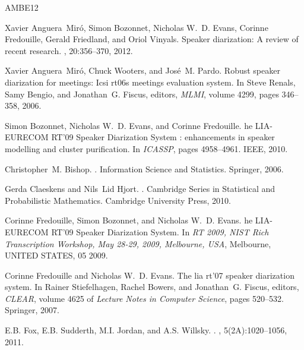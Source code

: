 \begin{thebibliography}{AMBE{\etalchar{+}}12}

Xavier Anguera~Miró, Simon Bozonnet, Nicholas W.~D. Evans, Corinne Fredouille,
  Gerald Friedland, and Oriol Vinyals.
\newblock Speaker diarization: A review of recent research.
,
  20:356--370, 2012.

Xavier Anguera~Miró, Chuck Wooters, and José~M. Pardo.
\newblock Robust speaker diarization for meetings: Icsi rt06s meetings
  evaluation system.
\newblock In Steve Renals, Samy Bengio, and Jonathan~G. Fiscus, editors, {\em
  MLMI}, volume 4299, pages 346--358, 2006.

Simon Bozonnet, Nicholas W.~D. Evans, and Corinne Fredouille.
he {LIA}-{EURECOM} {RT}'09 {S}peaker {D}iarization {S}ystem :
  enhancements in speaker modelling and cluster purification.
\newblock In {\em ICASSP}, pages 4958--4961. IEEE, 2010.

Christopher~M. Bishop.
.
\newblock Information Science and Statistics. Springer, 2006.

Gerda Claeskens and Nils~Lid Hjort.
.
\newblock Cambridge Series in Statistical and Probabilistic Mathematics.
  Cambridge University Press, 2010.

Corinne Fredouille, Simon Bozonnet, and Nicholas W.~D. Evans.
he {LIA}-{EURECOM} {RT}'09 {S}peaker {D}iarization {S}ystem.
\newblock In {\em {RT} 2009, {NIST} {R}ich {T}ranscription {W}orkshop, {M}ay
  28-29, 2009, {M}elbourne, {USA}}, {M}elbourne, {UNITED} {STATES}, 05 2009.

Corinne Fredouille and Nicholas W.~D. Evans.
\newblock The lia rt'07 speaker diarization system.
\newblock In Rainer Stiefelhagen, Rachel Bowers, and Jonathan~G. Fiscus,
  editors, {\em CLEAR}, volume 4625 of {\em Lecture Notes in Computer Science},
  pages 520--532. Springer, 2007.

E.B. Fox, E.B. Sudderth, M.I. Jordan, and A.S. Willsky.
.
, 5(2A):1020--1056, 2011.


\end{thebibliography}
